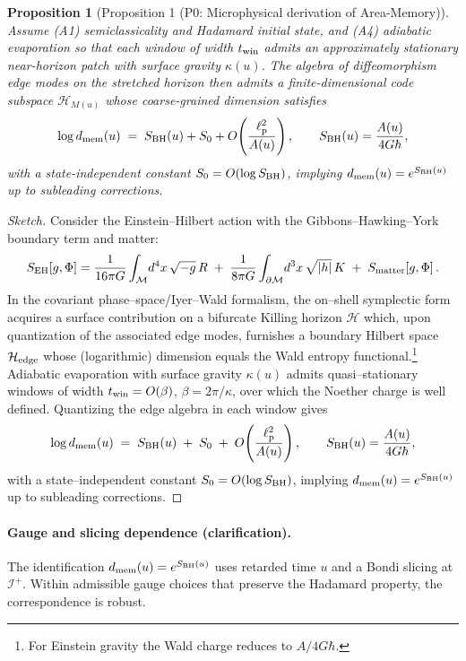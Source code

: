 \documentclass[a4paper,11pt]{article}
\theoremstyle{plain}
\newtheorem{proposition}{Proposition}
\theoremstyle{definition}
\theoremstyle{remark}
\begin{document}
\begin{proposition}[Proposition 1 (P0: Microphysical derivation of Area-Memory)]
\label{lem:P0-derivation}
\label{prop:P0-derivation}
Assume (A1) semiclassicality and Hadamard initial state, and (A4) adiabatic evaporation so that each window of width $t_{\rm win}$
admits an approximately stationary near-horizon patch with surface gravity $\kappa(u)$. The algebra of diffeomorphism edge modes on
the stretched horizon then admits a finite-dimensional code subspace $\mathcal{H}_{M(u)}$ whose coarse-grained dimension satisfies
\[
\log d_{\rm mem}(u) \;=\; S_{\rm BH}(u) + S_0 + O\!\left(\frac{\ell_{\rm p}^2}{A(u)}\right),\qquad S_{\rm BH}(u)=\frac{A(u)}{4G\hbar},
\]
with a state-independent constant $S_0=O(\log S_{\rm BH})$, implying $d_{\rm mem}(u)=e^{S_{\rm BH}(u)}$ up to subleading corrections.
\end{proposition}
\begin{proof}[Sketch]
Consider the Einstein--Hilbert action with the Gibbons--Hawking--York boundary term and matter:
\begin{equation}
S_{\rm EH}[g,\Phi]=\frac{1}{16\pi G}\int_{\mathcal{M}}\!d^4x\,\sqrt{-g}\,R\;+\;\frac{1}{8\pi G}\int_{\partial\mathcal{M}}\!d^3x\,\sqrt{|h|}\,K\;+\;S_{\rm matter}[g,\Phi]\,.
\end{equation}
In the covariant phase--space/Iyer--Wald formalism, the on--shell symplectic form acquires a surface contribution on a bifurcate Killing horizon $\mathcal{H}$ which, upon quantization of the associated edge modes, furnishes a boundary Hilbert space $\mathcal{H}_{\rm edge}$ whose (logarithmic) dimension equals the Wald entropy functional.\footnote{For Einstein gravity the Wald charge reduces to $A/4G\hbar$.}
Adiabatic evaporation with surface gravity $\kappa(u)$ admits quasi--stationary windows of width $t_{\rm win}=O(\beta)$, $\beta=2\pi/\kappa$, over which the Noether charge is well defined. Quantizing the edge algebra in each window gives
\begin{equation}
\log d_{\rm mem}(u)\;=\;S_{\rm BH}(u)\;+\;S_0\;+\;O\!\left(\frac{\ell_{\rm p}^2}{A(u)}\right),
\qquad S_{\rm BH}(u)=\frac{A(u)}{4G\hbar},
\end{equation}
with a state--independent constant $S_0=O(\log S_{\rm BH})$, implying $d_{\rm mem}(u)=e^{S_{\rm BH}(u)}$ up to subleading corrections.
\end{proof}

\paragraph{Gauge and slicing dependence (clarification).}
The identification \(d_{\rm mem}(u)=e^{S_{\rm BH}(u)}\) uses retarded time \(u\) and a Bondi slicing at \(\mathcal{I}^+\).
Within admissible gauge choices that preserve the Hadamard property, the correspondence is robust.
\end{document}
